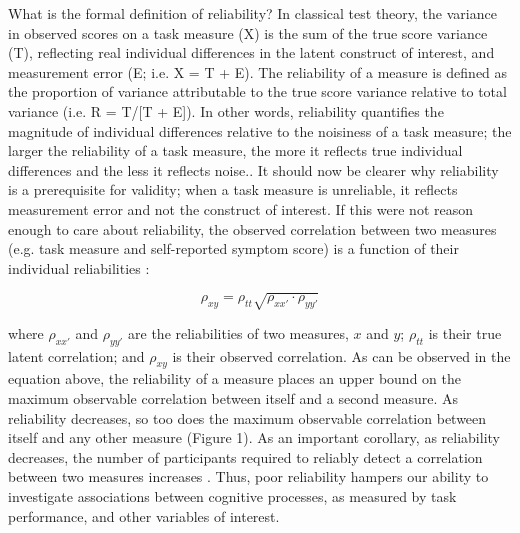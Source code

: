 \documentclass[a4paper,notitlepage,12pt]{article}
\begin{document}

What is the formal definition of reliability? In classical test theory, the variance in observed scores on a task measure (X) is the sum of the true score variance (T), reflecting real individual differences in the latent construct of interest, and measurement error (E; i.e. X = T + E). The reliability of a measure is defined as the proportion of variance attributable to the true score variance relative to total variance (i.e. R = T/[T + E]). In other words, reliability quantifies the magnitude of individual differences relative to the noisiness of a task measure; the larger the reliability of a task measure, the more it reflects true individual differences and the less it reflects noise.. It should now be clearer why reliability is a prerequisite for validity; when a task measure is unreliable, it reflects measurement error and not the construct of interest. If this were not reason enough to care about reliability, the observed correlation between two measures (e.g. task measure and self-reported symptom score) is a function of their individual reliabilities \cite{Spearman1904-mo}: 

\begin{equation}
    \rho_{xy} = \rho_{tt} \sqrt{\rho_{xx'} \cdot \rho_{yy'}}
\end{equation}

where $\rho_{xx'}$ and $\rho_{yy'}$ are the reliabilities of two measures, $x$ and $y$; $\rho_{tt}$ is their true latent correlation; and  $\rho_{xy}$ is their observed correlation. As can be observed in the equation above, the reliability of a measure places an upper bound on the maximum observable correlation between itself and a second measure. As reliability decreases, so too does the maximum observable correlation between itself and any other measure (Figure 1). As an important corollary, as reliability decreases, the number of participants required to reliably detect a correlation between two measures increases \cite{Parsons2019-jw}. Thus, poor reliability hampers our ability to investigate associations between cognitive processes, as measured by task performance, and other variables of interest. 

\end{document}
